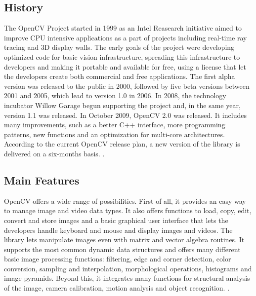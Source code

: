 	\subsection*{History}
	The \mbox{OpenCV} Project started in 1999 as an Intel Reasearch initiative aimed to improve CPU intensive applications as a part of projects including real-time ray tracing and 3D display walls. The early goals of the project were developing optimized code for basic vision infrastructure, spreading this infrastructure to developers and making it portable and available for free, using a license that let the developers create both commercial and free applications.\newline
	The first alpha version was released to the public in 2000, followed by five beta versions between 2001 and 2005, which lead to version 1.0 in 2006. In 2008, the technology incubator Willow Garage begun supporting the project and, in the same year, version 1.1  was released.
	In October 2009, \mbox{OpenCV} 2.0 was released. It includes many improvements, such as a better C++ interface, more programming patterns, new functions and an optimization for multi-core architectures. According to the current \mbox{OpenCV} release plan, a new version of the library is delivered on a six-months basis. \cite{OpenCV:ChangeLogs}.
	
	\subsection*{Main Features}
	\mbox{OpenCV} offers a wide range of possibilities. First of all, it provides an easy way to manage image and video data types. It also offers functions to load, copy, edit, convert and store images and a basic graphical user interface that lets the developers handle keyboard and mouse and display images and videos. The library lets manipulate images even with matrix and vector algebra routines. It supports the most common dynamic data structures and offers many different basic image processing functions: filtering, edge and corner detection, color conversion, sampling and interpolation, morphological operations, histograms and image pyramids. Beyond this, it integrates many functions for structural analysis of the image, camera calibration, motion analysis and object recognition. \cite{Agam2006}.
